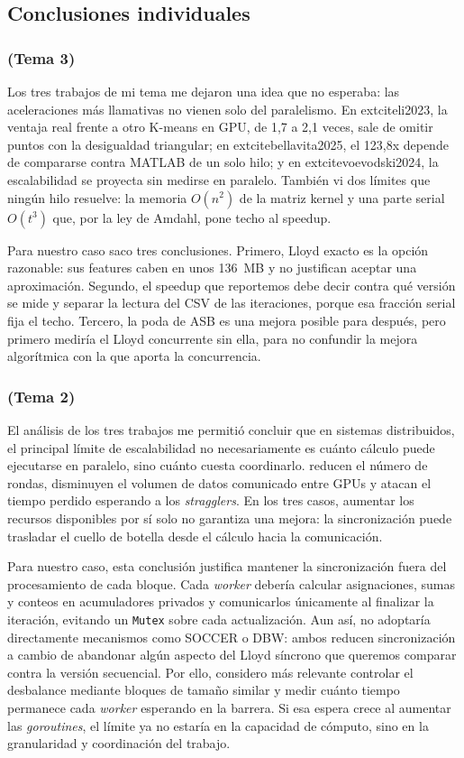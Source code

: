 \subsection{Conclusiones individuales}

\subsubsection*{\nombreRody{} (Tema 3)}
Los tres trabajos de mi tema me dejaron una idea que no esperaba: las aceleraciones más llamativas
no vienen solo del paralelismo. En 	extcite{li2023}, la ventaja real frente a otro K-means en GPU,
de 1,7 a 2,1 veces, sale de omitir puntos con la desigualdad triangular; en
	extcite{bellavita2025}, el 123,8x depende de compararse contra MATLAB de un solo hilo; y en
	extcite{voevodski2024}, la escalabilidad se proyecta sin medirse en paralelo. También vi dos
límites que ningún hilo resuelve: la memoria $O(n^2)$ de la matriz kernel y una parte serial
$O(t^3)$ que, por la ley de Amdahl, pone techo al speedup.

Para nuestro caso saco tres conclusiones. Primero, Lloyd exacto es la opción razonable: sus features
caben en unos 136~MB y no justifican aceptar una aproximación. Segundo, el speedup que reportemos
debe decir contra qué versión se mide y separar la lectura del CSV de las iteraciones, porque esa
fracción serial fija el techo. Tercero, la poda de ASB es una mejora posible para después, pero
primero mediría el Lloyd concurrente sin ella, para no confundir la mejora algorítmica con la que
aporta la concurrencia.

\subsubsection*{\nombreDayana{} (Tema 2)}
El análisis de los tres trabajos me permitió concluir que en sistemas distribuidos, el principal
límite de escalabilidad no necesariamente es cuánto cálculo puede ejecutarse en paralelo, sino
cuánto cuesta coordinarlo. \textcite{hess2023} reducen el número de rondas, \textcite{bellavita2026} disminuyen el
volumen de datos comunicado entre GPUs y \textcite{xu2021} atacan el tiempo perdido esperando a los
\textit{stragglers}. En los tres casos, aumentar los recursos disponibles por sí solo no garantiza
una mejora: la sincronización puede trasladar el cuello de botella desde el cálculo hacia la
comunicación.

Para nuestro caso, esta conclusión justifica mantener la sincronización fuera del procesamiento de
cada bloque. Cada \textit{worker} debería calcular asignaciones, sumas y conteos en acumuladores
privados y comunicarlos únicamente al finalizar la iteración, evitando un \texttt{Mutex} sobre cada
actualización. Aun así, no adoptaría directamente mecanismos como SOCCER o DBW: ambos reducen
sincronización a cambio de abandonar algún aspecto del Lloyd síncrono que queremos comparar contra
la versión secuencial. Por ello, considero más relevante controlar el desbalance mediante bloques
de tamaño similar y medir cuánto tiempo permanece cada \textit{worker} esperando en la barrera. Si
esa espera crece al aumentar las \textit{goroutines}, el límite ya no estaría en la capacidad de
cómputo, sino en la granularidad y coordinación del trabajo.

